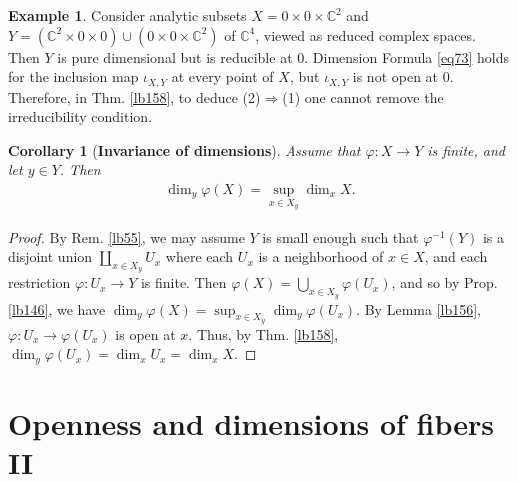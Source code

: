 \documentclass[12pt,b5paper,notitlepage]{report}
\theoremstyle{definition}
\newtheorem{eg}[df]{Example}
\newtheorem{rem}[df]{Remark}
\theoremstyle{plain}
\newtheorem{co}[df]{Corollary}
\newcommand{\Cbb}{\mathbb C}
\numberwithin{equation}{section}
\begin{document}
\begin{comment}
\begin{rem}
In the proof of (1)$\Rightarrow$(2), we have shown that if $\varphi:X\rightarrow Y$ is a finite holomorphic map of complex spaces and if $A$ is an analytic subset of $X$ which is irreducible at $x\in X$, then the analytic subset $\varphi(A)$ of $Y$ is irreducible at $\varphi(x)$. This also follows from the geometric description of the irreducibility in Rem. \ref{lb128}.
\end{rem}
\end{comment}



\begin{eg}
Consider analytic subsets $X=0\times 0\times\Cbb^2$ and $Y=(\Cbb^2\times 0\times 0)\cup (0\times 0\times\Cbb^2)$ of $\Cbb^4$, viewed as reduced complex spaces. Then $Y$ is pure dimensional but is reducible at $0$. Dimension Formula \eqref{eq73} holds for the inclusion map $\iota_{X,Y}$ at every point of $X$, but $\iota_{X,Y}$ is not open at $0$. Therefore, in Thm. \ref{lb158}, to deduce (2)$\Rightarrow$(1) one cannot remove the irreducibility condition.
\end{eg}



\begin{co}[\textbf{Invariance of dimensions}]\label{lb221}
Assume that $\varphi:X\rightarrow Y$ is finite, and let $y\in Y$. Then
\begin{align}
\dim_y \varphi(X)=\sup_{x\in X_y} \dim_x X.
\end{align}
\end{co}


\begin{proof}
By Rem. \ref{lb55}, we may assume $Y$ is small enough such that $\varphi^{-1}(Y)$ is a disjoint union $\coprod_{x\in X_y}U_x$ where each $U_x$ is a neighborhood of $x\in X$, and each restriction $\varphi:U_x\rightarrow Y$ is finite. Then $\varphi(X)=\bigcup_{x\in X_y}\varphi(U_x)$, and so by Prop. \ref{lb146}, we have $\dim_y\varphi(X)=\sup_{x\in X_y}\dim_y\varphi(U_x)$. By Lemma \ref{lb156}, $\varphi:U_x\rightarrow\varphi(U_x)$ is open at $x$. Thus, by Thm. \ref{lb158}, $\dim_y\varphi(U_x)=\dim_x U_x=\dim_x X$.
\end{proof}











\section{Openness and dimensions of fibers II}\label{lb284}
\end{document}
